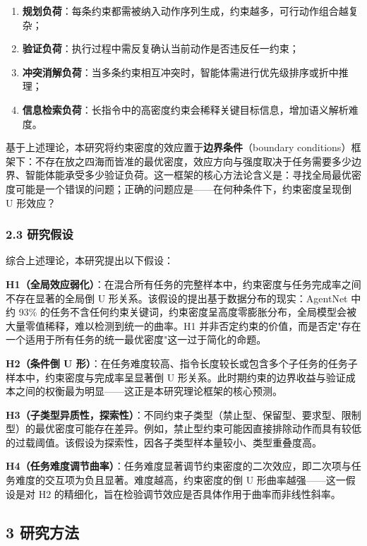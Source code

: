 \documentclass[12pt,a4paper,openany,oneside]{ctexrep}
\begin{document}
\begin{enumerate}
\item[1.] \textbf{规划负荷}：每条约束都需被纳入动作序列生成，约束越多，可行动作组合越复杂；
\item[2.] \textbf{验证负荷}：执行过程中需反复确认当前动作是否违反任一约束；
\item[3.] \textbf{冲突消解负荷}：当多条约束相互冲突时，智能体需进行优先级排序或折中推理；
\item[4.] \textbf{信息检索负荷}：长指令中的高密度约束会稀释关键目标信息，增加语义解析难度。
\end{enumerate}


基于上述理论，本研究将约束密度的效应置于\textbf{边界条件}（boundary conditions）框架下：不存在放之四海而皆准的最优密度，效应方向与强度取决于任务需要多少边界、智能体能承受多少验证负荷。这一框架的核心方法论含义是：寻找全局最优密度可能是一个错误的问题；正确的问题应是——在何种条件下，约束密度呈现倒 U 形效应？

\subsubsection{2.3 研究假设}


综合上述理论，本研究提出以下假设：

\textbf{H1（全局效应弱化）}：在混合所有任务的完整样本中，约束密度与任务完成率之间不存在显著的全局倒 U 形关系。该假设的提出基于数据分布的现实：AgentNet 中约 93\% 的任务不含任何约束关键词，约束密度呈高度零膨胀分布，全局模型会被大量零值稀释，难以检测到统一的曲率。H1 并非否定约束的价值，而是否定"存在一个适用于所有任务的统一最优密度"这一过于简化的命题。

\textbf{H2（条件倒 U 形）}：在任务难度较高、指令长度较长或包含多个子任务的任务子样本中，约束密度与完成率呈显著倒 U 形关系。此时期约束的边界收益与验证成本之间的权衡最为明显——这正是本研究理论框架的核心预测。

\textbf{H3（子类型异质性，探索性）}：不同约束子类型（禁止型、保留型、要求型、限制型）的最优密度可能存在差异。例如，禁止型约束可能因直接排除动作而具有较低的过载阈值。该假设为探索性，因各子类型样本量较小、类型重叠度高。

\textbf{H4（任务难度调节曲率）}：任务难度显著调节约束密度的二次效应，即二次项与任务难度的交互项为负且显著。难度越高，约束密度的倒 U 形曲率越强——这一假设是对 H2 的精细化，旨在检验调节效应是否具体作用于曲率而非线性斜率。

\subsection{3 研究方法}
\end{document}
